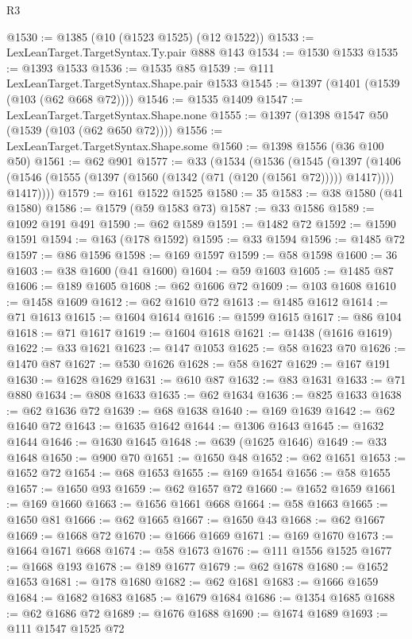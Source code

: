 \begin{lexlean}{R3}
\begin{coremodule}
@1530 := @1385 (@10 (@1523 @1525) (@12 @1522))
@1533 := LexLeanTarget.TargetSyntax.Ty.pair @888 @143
@1534 := @1530 @1533
@1535 := @1393 @1533
@1536 := @1535 @85
@1539 := @111 LexLeanTarget.TargetSyntax.Shape.pair @1533
@1545 := @1397 (@1401 (@1539 (@103 (@62 @668 @72))))
@1546 := @1535 @1409
@1547 := LexLeanTarget.TargetSyntax.Shape.none
@1555 := @1397 (@1398 @1547 @50 (@1539 (@103 (@62 @650 @72))))
@1556 := LexLeanTarget.TargetSyntax.Shape.some
@1560 := @1398 @1556 (@36 @100 @50)
@1561 := @62 @901
@1577 := @33
    (@1534
      (@1536
        (@1545
          (@1397
            (@1406 (@1546 (@1555 (@1397 (@1560 (@1342 (@71 (@120 (@1561 @72))))) @1417))))
            @1417))))
@1579 := @161 @1522 @1525
@1580 := 35
@1583 := @38 @1580 (@41 @1580)
@1586 := @1579 (@59 @1583 @73)
@1587 := @33 @1586
@1589 := @1092 @191 @491
@1590 := @62 @1589
@1591 := @1482 @72
@1592 := @1590 @1591
@1594 := @163 (@178 @1592)
@1595 := @33 @1594
@1596 := @1485 @72
@1597 := @86 @1596
@1598 := @169 @1597
@1599 := @58 @1598
@1600 := 36
@1603 := @38 @1600 (@41 @1600)
@1604 := @59 @1603
@1605 := @1485 @87
@1606 := @189 @1605
@1608 := @62 @1606 @72
@1609 := @103 @1608
@1610 := @1458 @1609
@1612 := @62 @1610 @72
@1613 := @1485 @1612
@1614 := @71 @1613
@1615 := @1604 @1614
@1616 := @1599 @1615
@1617 := @86 @104
@1618 := @71 @1617
@1619 := @1604 @1618
@1621 := @1438 (@1616 @1619)
@1622 := @33 @1621
@1623 := @147 @1053
@1625 := @58 @1623 @70
@1626 := @1470 @87
@1627 := @530 @1626
@1628 := @58 @1627
@1629 := @167 @191
@1630 := @1628 @1629
@1631 := @610 @87
@1632 := @83 @1631
@1633 := @71 @880
@1634 := @808 @1633
@1635 := @62 @1634
@1636 := @825 @1633
@1638 := @62 @1636 @72
@1639 := @68 @1638
@1640 := @169 @1639
@1642 := @62 @1640 @72
@1643 := @1635 @1642
@1644 := @1306 @1643
@1645 := @1632 @1644
@1646 := @1630 @1645
@1648 := @639 (@1625 @1646)
@1649 := @33 @1648
@1650 := @900 @70
@1651 := @1650 @48
@1652 := @62 @1651
@1653 := @1652 @72
@1654 := @68 @1653
@1655 := @169 @1654
@1656 := @58 @1655
@1657 := @1650 @93
@1659 := @62 @1657 @72
@1660 := @1652 @1659
@1661 := @169 @1660
@1663 := @1656 @1661 @668
@1664 := @58 @1663
@1665 := @1650 @81
@1666 := @62 @1665
@1667 := @1650 @43
@1668 := @62 @1667
@1669 := @1668 @72
@1670 := @1666 @1669
@1671 := @169 @1670
@1673 := @1664 @1671 @668
@1674 := @58 @1673
@1676 := @111 @1556 @1525
@1677 := @1668 @193
@1678 := @189 @1677
@1679 := @62 @1678
@1680 := @1652 @1653
@1681 := @178 @1680
@1682 := @62 @1681
@1683 := @1666 @1659
@1684 := @1682 @1683
@1685 := @1679 @1684
@1686 := @1354 @1685
@1688 := @62 @1686 @72
@1689 := @1676 @1688
@1690 := @1674 @1689
@1693 := @111 @1547 @1525 @72

\end{coremodule}
\end{lexlean}
